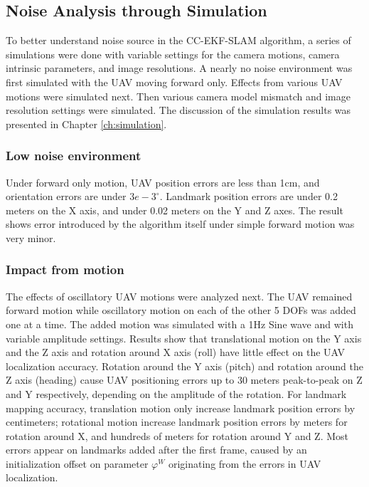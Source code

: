\subsection{Noise Analysis through Simulation}
To better understand noise source in the CC-EKF-SLAM algorithm, a series
of simulations were done with variable settings for the camera
motions, camera intrinsic parameters, and image resolutions. A nearly
no noise environment was first simulated with the UAV moving forward only.
Effects from various UAV motions were simulated next. Then
various camera model mismatch and image resolution settings were
simulated. The discussion of the simulation results was presented in
Chapter \ref{ch:simulation}.

\subsubsection{Low noise environment}
Under forward only motion, UAV position errors are less than 1cm, and
orientation errors are under $3e-3^\circ$. Landmark position errors
are under 0.2 meters on the X axis, and under 0.02 meters on the Y and
Z axes. The result shows error introduced by the algorithm
itself under simple forward motion was very minor.

\subsubsection{Impact from motion}
The effects of oscillatory UAV motions were analyzed next. The UAV
remained forward motion while oscillatory motion on each of the other
5 DOFs was added one at a time. The added motion was simulated with a
1Hz Sine wave and with variable amplitude settings. Results show that
translational motion on the Y axis and the Z axis and rotation around X axis
(roll) have little effect on the UAV localization accuracy. Rotation
around the Y axis (pitch) and rotation around the Z axis (heading) cause UAV
positioning errors up to 30 meters peak-to-peak on Z and Y
respectively, depending on the amplitude of the rotation. For landmark
mapping accuracy, translation motion only increase landmark
position errors by centimeters; rotational motion increase landmark
position errors by meters for rotation around X, and hundreds of
meters for rotation around Y and Z. Most errors appear on landmarks
added after the first frame, caused by an initialization offset on
parameter $\varphi^W$ originating from the errors in UAV localization.

